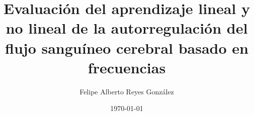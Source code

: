 \documentclass[tesis]{tesis-usach}
\title{Evaluación del aprendizaje lineal y no lineal de la autorregulación del flujo sanguíneo cerebral basado en frecuencias}
\author{Felipe Alberto Reyes González}
\date{\today}
\begin{document}
\renewcommand{\contentsname}{Tabla de contenido}
\renewcommand{\refname}{Bibliografía}
\renewcommand{\appendixname}{Apéndice}
\renewcommand{\appendixtocname}{Apéndices}
\renewcommand{\appendixpagename}{Apéndices}
\renewcommand{\tablename}{Tabla}


\maketitle

%
\tableofcontents
\newpage






%


\newpage
\bibliografia


% 


%
%

\end{document}
